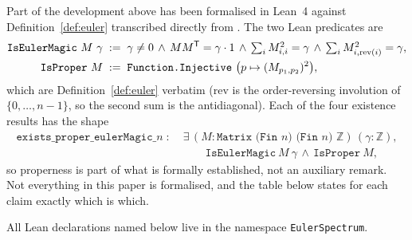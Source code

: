 \documentclass[11pt,a4paper]{amsart}
\theoremstyle{plain}
\theoremstyle{definition}
\theoremstyle{remark}
\newcommand{\ZZ}{\mathbb{Z}}
\newcommand{\tr}{\mathsf{T}}
\begin{document}
Part of the development above has been formalised in Lean~4 against
Definition~\ref{def:euler} transcribed directly from \cite{Muller2026}. The two
Lean predicates are
\begin{align*}
\texttt{IsEulerMagic}\ M\ \gamma \;&:=\;
  \gamma\ne0 \,\wedge\, M M^{\tr}=\gamma\cdot 1 \,\wedge\,
  \textstyle\sum_i M_{i,i}^2=\gamma \,\wedge\,
  \textstyle\sum_i M_{i,\mathrm{rev}(i)}^2=\gamma,\\
\texttt{IsProper}\ M \;&:=\;
  \text{\texttt{Function.Injective} } \big(p\mapsto (M_{p_1,p_2})^2\big),
\end{align*}
which are Definition~\ref{def:euler} verbatim ($\mathrm{rev}$ is the
order-reversing involution of $\{0,\dots,n-1\}$, so the second sum is the
antidiagonal). Each of the four existence results has the shape
\begin{align*}
\texttt{exists\_proper\_eulerMagic\_}n \;:\;
&\exists\,(M:\texttt{Matrix (Fin }n\texttt{) (Fin }n\texttt{) }\ZZ)\,
  (\gamma:\ZZ),\\[-2pt]
&\qquad \texttt{IsEulerMagic}\ M\ \gamma \,\wedge\, \texttt{IsProper}\ M,
\end{align*}
so properness is part of what is formally established, not an auxiliary remark.
Not everything in this paper is formalised, and the table below states for each
claim exactly which is which.

All Lean declarations named below live in the namespace
\texttt{EulerSpectrum}.
\end{document}
